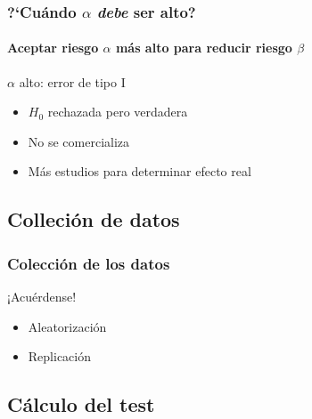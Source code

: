 \documentclass[gray,handout,mathserif]{beamer}
\begin{document}
\begin{frame}[label=betahigh2]
   \frametitle{?`Cu\'ando $\alpha$ \emph{debe} ser alto?}
   \framesubtitle{Aceptar riesgo $\alpha$ m\'as alto para reducir riesgo $\beta$  }
   \begin{block}{$\alpha$ alto: error de tipo I}
      \begin{itemize}
         \item $H_0$ rechazada pero verdadera 
         \item No se comercializa
         \item M\'as estudios para determinar efecto real
      \end{itemize}
   \end{block}

\end{frame}%


\subsection[Colleci\'on de datos]{Colleci\'on de datos}

\begin{frame}[label=datacoll]
   \frametitle{Colecci\'on de los datos}
   \begin{beamerboxesrounded}{¡Acu\'erdense!}
      \begin{itemize}
         \item Aleatorizaci\'on
         \item Replicaci\'on
      \end{itemize}
   \end{beamerboxesrounded}
\end{frame}%


\subsection[C\'alculo]{C\'alculo del test}
\end{document}
